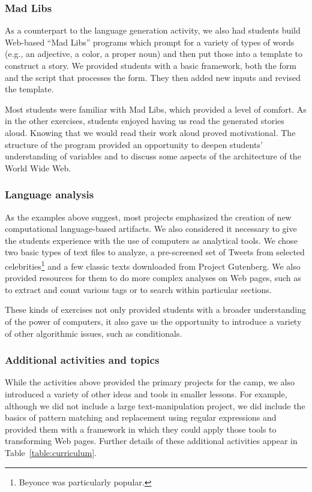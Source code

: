\subsubsection{Mad Libs}

As a counterpart to the language generation activity, we also had students
build Web-based ``Mad Libs'' programs which prompt for a variety of types
of words (e.g., an adjective, a color, a proper noun) and then put those
into a template to construct a story.  We provided students with a basic
framework, both the form and the script that processes the form.  They
then added new inputs and revised the template.

Most students were familiar with Mad Libs, which provided a level
of comfort. As in the other exercises, students enjoyed having us
read the generated stories aloud.  Knowing that we would read their
work aloud proved motivational.  The structure of the program
provided an opportunity to deepen students' understanding of variables
and to discuss some aspects of the architecture of the World Wide
Web.

\subsubsection{Language analysis}

As the examples above suggest, most projects emphasized the creation
of new computational language-based artifacts.  We also considered
it necessary to give the students experience with the use of computers
as analytical tools.  We chose two basic types of text files to
analyze, a pre-screened set of Tweets from selected
celebrities\footnote{Beyonce was particularly popular.} and a few
classic texts downloaded from Project Gutenberg.  We also provided
resources for them to do more complex analyses on Web pages, such
as to extract and count various tags or to search within particular
sections.

These kinds of exercises not only provided students with a broader 
understanding of the power of computers, it also gave us the opportunity
to introduce a variety of other algorithmic issues, such as conditionals.

\subsubsection{Additional activities and topics}

While the activities above provided the primary projects for the
camp, we also introduced a variety of other ideas and tools in
smaller lessons.  For example, although we did not include a large
text-manipulation project, we did include the basics of pattern
matching and replacement using regular expressions and provided
them with a framework in which they could apply those tools to
transforming Web pages.  Further details of these additional
activities appear in Table~\ref{table:curriculum}.

